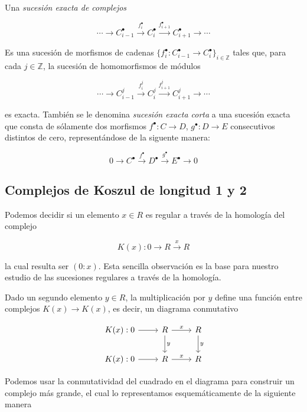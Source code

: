 \begin{definition}

Una \emph{sucesión exacta de complejos}

$$ \cdots \rightarrow C^{\bullet}_{i-1} \xrightarrow{f^{\bullet}_i} C^{\bullet}_i \xrightarrow{f^{\bullet}_{i+1}} C^{\bullet}_{i+1} \rightarrow \cdots$$

Es una sucesión de morfismos de cadenas $\{f^{\bullet}_i:C^{\bullet}_{i-1}\rightarrow C^{\bullet}_i\}_{i \in \mathbb{Z}}$ tales que, para cada $j\in \mathbb{Z}$, la sucesión de homomorfismos de módulos

$$ \cdots \rightarrow C^{j}_{i-1} \xrightarrow{f^j_i} C^{j}_i \xrightarrow{f^j_{i+1}} C^{j}_{i+1} \rightarrow \cdots$$

es exacta. También se le denomina \emph{sucesión exacta corta} a una sucesión exacta que consta de sólamente dos morfismos $f^\bullet:C\rightarrow D$, $g^\bullet:D\rightarrow E$ consecutivos distintos de cero, representándose de la siguente manera:

$$ 0 \rightarrow C^{\bullet} \xrightarrow{f^{\bullet}} D^{\bullet} \xrightarrow{g^{\bullet}} E^{\bullet} \rightarrow 0$$

\end{definition}

\subsection{Complejos de Koszul de longitud 1 y 2}

Podemos decidir si un elemento $x \in R$ es regular a través de la homología del complejo

$$ K(x):0\rightarrow R\xrightarrow{x} R $$

la cual resulta ser $(0:x)$. Esta sencilla observación es la base para nuestro estudio de las sucesiones regulares a través de la homología.

Dado un segundo elemento $y \in R$, la multiplicación por $y$ define una función entre complejos $K(x)\rightarrow K(x)$, es decir, un diagrama conmutativo

\[
\begin{tikzcd}
K(x):0 \arrow[r,""] & R \arrow[r,"x"] \arrow[d,"y"] & R \arrow[d,"y"]\\
K(x):0 \arrow[r,""] & R \arrow[r,"x"] & R
\end{tikzcd}
\]

Podemos usar la conmutatividad del cuadrado en el diagrama para construir un complejo más grande, el cual lo representamos esquemáticamente de la siguiente manera

